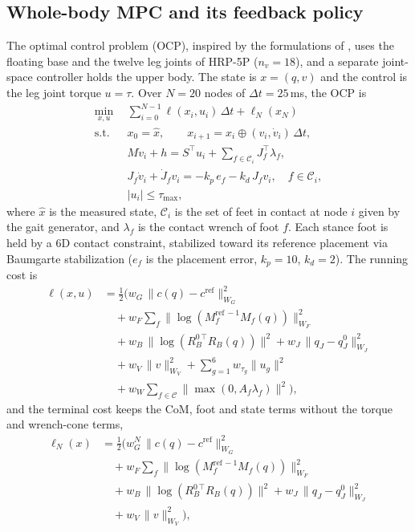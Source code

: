 \documentclass[conference]{IEEEtran}
\newcommand{\T}{^{\top}}
\begin{document}
\subsection{Whole-body MPC and its feedback policy}
The optimal control problem (OCP), inspired by the formulations of \cite{mastalli2023idmpc,dantec2022wbmpc}, uses the floating base and the twelve leg joints of HRP-5P \cite{kaneko2019hrp5p} ($n_v=18$), and a separate joint-space controller holds the upper body.
The state is $x=(q,v)$ and the control is the leg joint torque $u=\tau$.
Over $N=20$ nodes of $\Delta t=25$\,ms, the OCP is
\begin{align}
\min_{x,u}\ \ &\textstyle\sum_{i=0}^{N-1}\ell(x_i,u_i)\,\Delta t+\ell_N(x_N)\nonumber\\
\text{s.t.}\ \ & x_0=\hat x,\qquad x_{i+1}=x_i\oplus(v_i,\dot v_i)\,\Delta t,\nonumber\\
& M\dot v_i+h=S\T u_i+\textstyle\sum_{f\in\mathcal C_i}J_f\T\lambda_f,\nonumber\\
& J_f\dot v_i+\dot J_f v_i=-k_p\,e_f-k_d\,J_f v_i,\quad f\in\mathcal C_i,\nonumber\\
& |u_i|\le\tau_{\max},
\label{eq:ocp}
\end{align}
where $\hat x$ is the measured state, $\mathcal C_i$ is the set of feet in contact at node $i$ given by the gait generator, and $\lambda_f$ is the contact wrench of foot $f$.
Each stance foot is held by a 6D contact constraint, stabilized toward its reference placement via Baumgarte stabilization \cite{baumgarte1972stabilization} ($e_f$ is the placement error, $k_p=10$, $k_d=2$).
The running cost is
\begin{align}
\ell(x,u)&=\tfrac12\Big(w_G\,\|c(q)-c^{\mathrm{ref}}\|^2_{W_G}\nonumber\\
&\quad+w_F\textstyle\sum_{f}\|\log(M_f^{\mathrm{ref}\,-1}M_f(q))\|^2_{W_F}\nonumber\\
&\quad+w_B\,\|\log(R_B^{0\,\top}R_B(q))\|^2+w_J\,\|q_J-q_J^0\|^2_{W_J}\nonumber\\
&\quad+w_V\,\|v\|^2_{W_V}+\textstyle\sum_{g=1}^{6}w_{\tau_g}\|u_g\|^2\nonumber\\
&\quad+w_W\textstyle\sum_{f\in\mathcal C}\|\max(0,A_f\lambda_f)\|^2\Big),
\label{eq:costwb}
\end{align}
and the terminal cost keeps the CoM, foot and state terms without the torque and wrench-cone terms,
\begin{align}
\ell_N(x)&=\tfrac12\Big(w_G^N\,\|c(q)-c^{\mathrm{ref}}\|^2_{W_G}\nonumber\\
&\quad+w_F\textstyle\sum_{f}\|\log(M_f^{\mathrm{ref}\,-1}M_f(q))\|^2_{W_F}\nonumber\\
&\quad+w_B\,\|\log(R_B^{0\,\top}R_B(q))\|^2+w_J\,\|q_J-q_J^0\|^2_{W_J}\nonumber\\
&\quad+w_V\,\|v\|^2_{W_V}\Big),
\label{eq:costterm}
\end{align}
\end{document}

